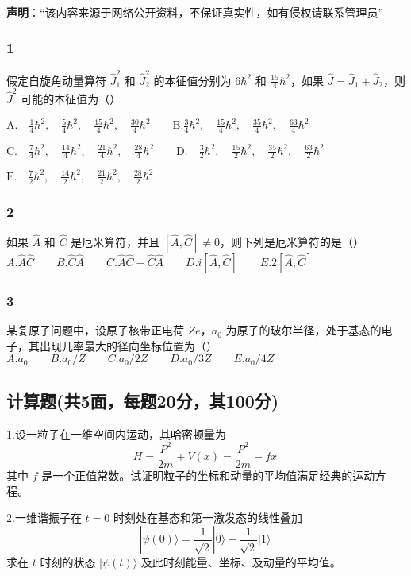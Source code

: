 
\textbf{声明}：“该内容来源于网络公开资料，不保证真实性，如有侵权请联系管理员”

\subsubsection{1}
假定自旋角动量算符 $\hat{J}_1^2$ 和 $\hat{J}_2^2$ 的本征值分别为 $6\hbar^2$ 和 $\frac{15}{4}\hbar^2$，如果 $\hat{J} = \hat{J}_1 + \hat{J}_2$，则 $\hat{J}^2$ 可能的本征值为（）

$\text{A.} \quad \frac{1}{4}\hbar^2, \quad \frac{5}{4}\hbar^2, \quad \frac{15}{4}\hbar^2, \quad \frac{30}{4}\hbar^2\qquad \text{B.}\frac{3}{4}\hbar^2, \quad \frac{15}{4}\hbar^2, \quad \frac{35}{4}\hbar^2, \quad \frac{63}{4}\hbar^2$

$\text{C.} \quad \frac{7}{4}\hbar^2, \quad \frac{14}{4}\hbar^2, \quad \frac{21}{4}\hbar^2, \quad \frac{28}{4}\hbar^2\qquad\text{D.} \quad \frac{3}{2}\hbar^2, \quad \frac{15}{2}\hbar^2, \quad \frac{35}{2}\hbar^2, \quad \frac{63}{2}\hbar^2$

$\text{E.} \quad \frac{7}{2}\hbar^2, \quad \frac{14}{2}\hbar^2, \quad \frac{21}{2}\hbar^2, \quad \frac{28}{2}\hbar^2$
\subsubsection{2}
如果 $\hat{A}$ 和 $\hat{C}$ 是厄米算符，并且 $[\hat{A}, \hat{C}] \neq 0$，则下列是厄米算符的是（）\\
$A. \hat{A}\hat{C}\qquad B. \hat{C}\hat{A}\qquad C. \hat{A}\hat{C} - \hat{C}\hat{A}\qquad D. i[\hat{A}, \hat{C}]\qquad E. 2[\hat{A}, \hat{C}]$
\subsubsection{3}
某复原子问题中，设原子核带正电荷 $Ze$，$a_0$ 为原子的玻尔半径，处于基态的电子，其出现几率最大的径向坐标位置为（）\\
$A. a_0\qquad B. a_0/Z \qquad C. a_0/2Z\qquad D. a_0/3Z\qquad E. a_0/4Z$
\subsection{计算题(共5面，每题20分，其100分)}
1.设一粒子在一维空间内运动，其哈密顿量为
$$H = \frac{P^2}{2m} + V(x) = \frac{P^2}{2m} - fx~$$
其中 $f$ 是一个正值常数。试证明粒子的坐标和动量的平均值满足经典的运动方程。

2.一维谐振子在 $t=0$ 时刻处在基态和第一激发态的线性叠加
$$|\psi(0)\rangle = \frac{1}{\sqrt{2}} |0\rangle + \frac{1}{\sqrt{2}} |1\rangle~$$
求在 $t$ 时刻的状态 $|\psi(t)\rangle$ 及此时刻能量、坐标、及动量的平均值。

